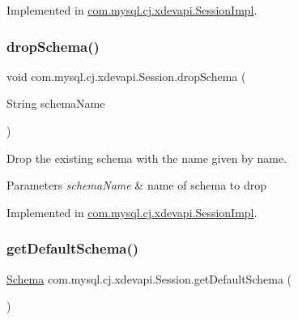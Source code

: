 Implemented in \mbox{\hyperlink{classcom_1_1mysql_1_1cj_1_1xdevapi_1_1_session_impl_ae98234f9b7a73f758946297806aeb639}{com.\+mysql.\+cj.\+xdevapi.\+Session\+Impl}}.

\mbox{\label{interfacecom_1_1mysql_1_1cj_1_1xdevapi_1_1_session_af292b70a8b7a6a159e98d36a2729b0e7}} 
\subsubsection{\texorpdfstring{drop\+Schema()}{dropSchema()}}
{\footnotesize\ttfamily void com.\+mysql.\+cj.\+xdevapi.\+Session.\+drop\+Schema (\begin{DoxyParamCaption}\item[{String}]{schema\+Name }\end{DoxyParamCaption})}

Drop the existing schema with the name given by name.


\begin{DoxyParams}{Parameters}
{\em schema\+Name} & name of schema to drop \\
\hline
\end{DoxyParams}


Implemented in \mbox{\hyperlink{classcom_1_1mysql_1_1cj_1_1xdevapi_1_1_session_impl_acc48589d267536ca687a05dfb315415c}{com.\+mysql.\+cj.\+xdevapi.\+Session\+Impl}}.

\mbox{\label{interfacecom_1_1mysql_1_1cj_1_1xdevapi_1_1_session_a8ead4f7e01e906447c15d9e6ce38ead2}} 
\subsubsection{\texorpdfstring{get\+Default\+Schema()}{getDefaultSchema()}}
{\footnotesize\ttfamily \mbox{\hyperlink{interfacecom_1_1mysql_1_1cj_1_1xdevapi_1_1_schema}{Schema}} com.\+mysql.\+cj.\+xdevapi.\+Session.\+get\+Default\+Schema (\begin{DoxyParamCaption}{ }\end{DoxyParamCaption})}

